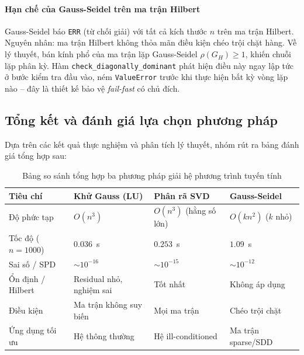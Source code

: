 \paragraph{Hạn chế của Gauss-Seidel trên ma trận Hilbert}

Gauss-Seidel báo \texttt{ERR} (từ chối giải) với tất cả kích thước $n$ trên ma trận Hilbert. Nguyên nhân: ma trận Hilbert không thỏa mãn điều kiện chéo trội chặt hàng. Về lý thuyết, bán kính phổ của ma trận lặp Gauss-Seidel $\rho(G_H) \geq 1$, khiến chuỗi lặp phân kỳ. Hàm \texttt{check\_diagonally\_dominant} phát hiện điều này ngay lập tức ở bước kiểm tra đầu vào, ném \texttt{ValueError} trước khi thực hiện bất kỳ vòng lặp nào -- đây là thiết kế bảo vệ \textit{fail-fast} có chủ đích.

\subsection{Tổng kết và đánh giá lựa chọn phương pháp}

Dựa trên các kết quả thực nghiệm và phân tích lý thuyết, nhóm rút ra bảng đánh giá tổng hợp sau:

\begin{table}[h!]
\centering
\caption{Bảng so sánh tổng hợp ba phương pháp giải hệ phương trình tuyến tính}
\label{tab:summary}
\begin{tabular}{|l|l|l|l|}
\hline
\textbf{Tiêu chí} & \textbf{Khử Gauss (LU)} & \textbf{Phân rã SVD} & \textbf{Gauss-Seidel} \\
\hline
Độ phức tạp & $O(n^3)$ & $O(n^3)$ (hằng số lớn) & $O(kn^2)$ ($k$ nhỏ) \\
\hline
Tốc độ ($n=1000$) & $0.036$~s & $0.253$~s & $1.09$~s \\
\hline
Sai số / SPD & $\sim 10^{-16}$ & $\sim 10^{-15}$ & $\sim 10^{-12}$ \\
\hline
Ổn định / Hilbert & Residual nhỏ, nghiệm sai & Tốt nhất & Không áp dụng \\
\hline
Điều kiện & Ma trận không suy biến & Mọi ma trận & Chéo trội chặt \\
\hline
Ứng dụng tối ưu & Hệ thông thường & Hệ ill-conditioned & Ma trận sparse/SDD \\
\hline
\end{tabular}
\end{table}

